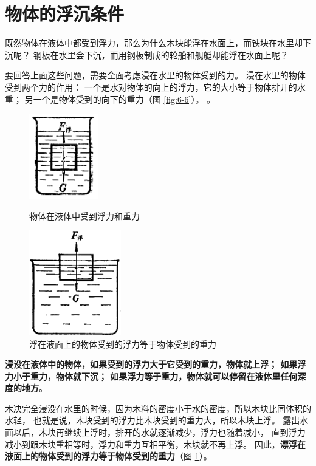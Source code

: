 \section{物体的浮沉条件}\label{sec:6-3}

既然物体在液体中都受到浮力，那么为什么木块能浮在水面上，而铁块在水里却下沉呢？
钢板在水里会下沉，而用钢板制成的轮船和舰艇却能浮在水面上呢？

要回答上面这些问题，需要全面考虑浸在水里的物体受到的力。
浸在水里的物体受到两个力的作用：
一个是水对物体的向上的浮力，它的大小等于物体排开的水重；
另一个是物体受到的向下的重力（图 \ref{fig:6-6}）。
。

\begin{figure}[htbp]
    \centering
    \begin{minipage}{7cm}
    \centering
    \includegraphics[width=3cm]{../pic/czwl1-ch6-6}
    \caption{物体在液体中受到浮力和重力}\label{fig:6-6}
    \end{minipage}
    \qquad
    \begin{minipage}{7cm}
    \centering
    \includegraphics[width=4cm]{../pic/czwl1-ch6-7}
    \caption{浮在液面上的物体受到的浮力等于物体受到的重力}\label{fig:6-7}
    \end{minipage}
\end{figure}

\textbf{浸没在液体中的物体，如果受到的浮力大于它受到的重力，物体就上浮；
如果浮力小于重力，物体就下沉；
如果浮力等于重力，物体就可以停留在液体里任何深度的地方}。

木决完全浸没在水里的时候，因为木料的密度小于水的密度，所以木块比同体积的水轻，
也就是说，木块受到的浮力比木块受到的重力大，所以木块上浮。
露出水面以后，木块再继续上浮时，排开的水就逐渐减少，浮力也随着减小，
直到浮力减小到跟木块重相等时，浮力和重力互相平衡，木块就不再上浮。
因此，\textbf{漂浮在液面上的物体受到的浮力等于物体受到的重力}（图 \ref{fig:6-7}）。


